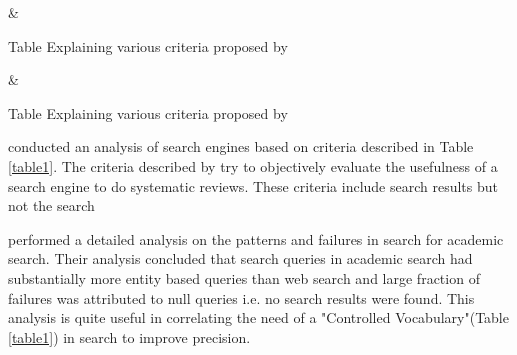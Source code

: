 \begin{table*}[h]
    \label{table\arabic{tablecounter}}
            {\Criteria & \Meaning}
            \centering
            \caption{\label{tablecounter}Table Explaining various criteria proposed by \cite{gusenbauer2020academic}}
\end{table*}

\begin{table*}[h]
    \label{table\arabic{tablecounter}}
            {\Criteria & \Meaning}
            \centering
            \caption{\label{tablecounter}Table Explaining various criteria proposed by \cite{gusenbauer2020academic}}
\end{table*}

\cite{gusenbauer2020academic} conducted an analysis of search engines based on criteria described in Table \ref{table1}.
The criteria described by \cite{gusenbauer2020academic} try to objectively evaluate the usefulness of a search engine to do systematic reviews.
These criteria include search results but not the search 

\cite{li2017investigating} performed a detailed analysis on the patterns and failures in search for academic search. 
Their analysis concluded that search queries in academic search had substantially more entity based queries than web search and 
large fraction of failures was attributed to null queries i.e. no search results were found. 
This analysis is quite useful in correlating the need of a "Controlled Vocabulary"(Table \ref{table1}) in search to improve precision. 

